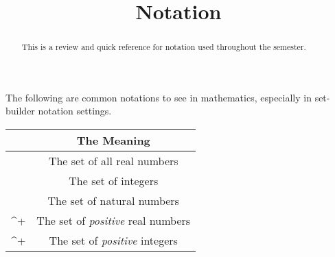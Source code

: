 \documentclass{ximeraXloud}
\title{Notation}
\begin{document}
\begin{abstract}
This is a review and quick reference for notation used throughout the semester.
\end{abstract}
\maketitle




The following are common notations to see in mathematics, especially in set-builder notation settings.
\begin{center}
\begin{tabular}{ C c }
 & The Meaning \\ \hline
{} & The set of all real numbers\\
 & The set of integers\\
 & The set of natural numbers\\
^+ & The set of \textit{positive} real numbers \\
^+  & The set of \textit{positive} integers
\end{tabular}
\end{center}
    
    
\end{document}
